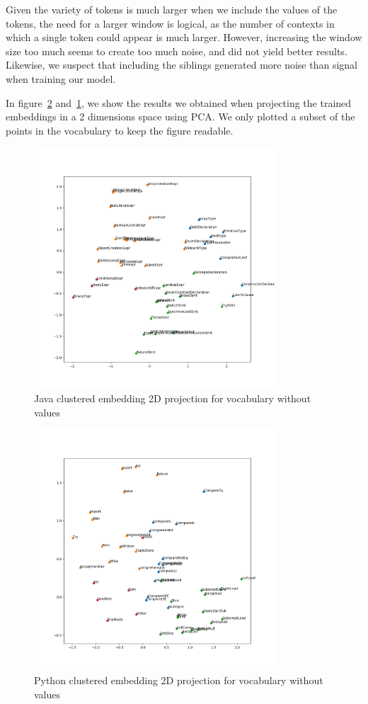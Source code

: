 Given the variety of tokens is much larger when we include the values of the
tokens, the need for a larger window is logical, as the number of contexts in
which a single token could appear is much larger. However, increasing the window
size too much seems to create too much noise, and did not yield better results.
Likewise, we suspect that including the siblings generated more noise than
signal when training our model.

In figure~\ref{fig:python-embeddings} and~\ref{fig:java-embeddings}, we show the
results we obtained when projecting the trained embeddings in a 2 dimensions
space using PCA\cite{DBLP:journals/corr/Shlens14}. We only plotted a subset of
the points in the vocabulary to keep the figure readable.

\begin{figure}
  \centering\includegraphics[height=9cm]{images/java-embeddings.png}
  \caption{\label{fig:java-embeddings}Java clustered embedding 2D projection for vocabulary without
  values}
\end{figure}

\begin{figure}
  \centering\includegraphics[height=9cm]{images/python-embeddings.png}
  \caption{\label{fig:python-embeddings}Python clustered embedding 2D projection for vocabulary without
  values}
\end{figure}

